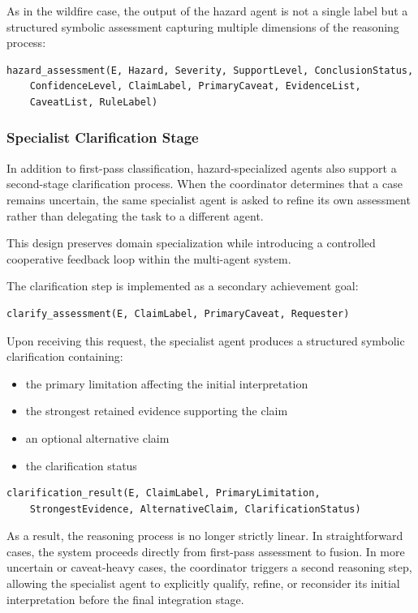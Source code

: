 \documentclass[12pt]{article}
\begin{document}
As in the wildfire case, the output of the hazard agent is not a single label but a structured symbolic assessment capturing multiple dimensions of the reasoning process:

\begin{lstlisting}
hazard_assessment(E, Hazard, Severity, SupportLevel, ConclusionStatus,
    ConfidenceLevel, ClaimLabel, PrimaryCaveat, EvidenceList,
    CaveatList, RuleLabel)
\end{lstlisting}

\subsubsection{Specialist Clarification Stage}

In addition to first-pass classification, hazard-specialized agents also support a second-stage clarification process. When the coordinator determines that a case remains uncertain, the same specialist agent is asked to refine its own assessment rather than delegating the task to a different agent.

This design preserves domain specialization while introducing a controlled cooperative feedback loop within the multi-agent system.

The clarification step is implemented as a secondary achievement goal:

\begin{lstlisting}
clarify_assessment(E, ClaimLabel, PrimaryCaveat, Requester)
\end{lstlisting}

Upon receiving this request, the specialist agent produces a structured symbolic clarification containing:

\begin{itemize}
\item the primary limitation affecting the initial interpretation
\item the strongest retained evidence supporting the claim
\item an optional alternative claim
\item the clarification status
\end{itemize}

\begin{lstlisting}
clarification_result(E, ClaimLabel, PrimaryLimitation,
    StrongestEvidence, AlternativeClaim, ClarificationStatus)
\end{lstlisting}

As a result, the reasoning process is no longer strictly linear. In straightforward cases, the system proceeds directly from first-pass assessment to fusion. In more uncertain or caveat-heavy cases, the coordinator triggers a second reasoning step, allowing the specialist agent to explicitly qualify, refine, or reconsider its initial interpretation before the final integration stage.
\end{document}
